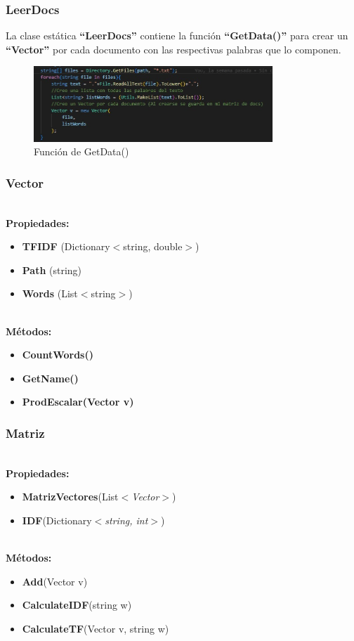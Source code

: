 \documentclass{beamer}
\begin{document}
    \begin{frame}
        \frametitle{LeerDocs}
        La clase estática \textbf{“LeerDocs”} contiene la función \textbf{“GetData()”} para crear un \textbf{“Vector”} por cada 
        documento con las respectivas palabras que lo componen.
        \begin{figure}[h]
            \includegraphics[width = 9cm]{img/LeerDocs.jpg}
            \caption[]{Función de GetData()}
        \end{figure}  
    \end{frame}
    \begin{frame}
        \frametitle{Vector}
        \textbf{\\\large{Propiedades:}}
        \begin{itemize}
            \item \textbf{TFIDF} (Dictionary$<$string, double$>$)
            \item \textbf{Path} (string)
            \item \textbf{Words} (List$<$string$>$)
        \end{itemize}
        \textbf{\\\large{Métodos:}}
        \begin{itemize}
            \item  \textbf{CountWords()}
            \item \textbf{GetName()}
            \item  \textbf{ProdEscalar(Vector v)}
        \end{itemize}
    \end{frame}
    \begin{frame}
        \frametitle{Matriz}
        \textbf{\\\large{Propiedades:}}
        \begin{itemize}
            \item  \textbf{MatrizVectores}(List\textit{$<$Vector$>$})
            \item \textbf{IDF}(Dictionary\textit{$<$string, int$>$})
        \end{itemize}
        \textbf{\\\large{Métodos:}}
        \begin{itemize}
            \item  \textbf{Add}(Vector v)
            \item \textbf{CalculateIDF}(string w)
            \item \textbf{CalculateTF}(Vector v, string w)
        \end{itemize}
    \end{frame}
\end{document}
